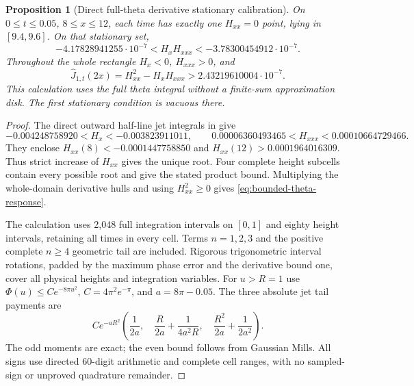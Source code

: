 \documentclass[11pt]{article}
\newtheorem{proposition}[theorem]{Proposition}
\theoremstyle{definition}
\theoremstyle{remark}
\begin{document}
\begin{proposition}[Direct full-theta derivative stationary calibration]
\label{prop:low-theta-sign}
On $0\le t\le0.05$, $8\le x\le12$, each time has exactly one
$H_{xx}=0$ point, lying in $[9.4,9.6]$. On that stationary set,
\[
 -4.17828941255\cdot10^{-7}<H_xH_{xxx}
 <-3.78300454912\cdot10^{-7}.
\]
Throughout the whole rectangle $H_x<0$, $H_{xxx}>0$, and
\begin{equation}
 \widehat J_{1,t}(2x)=H_{xx}^2-H_xH_{xxx}
 >2.43219610004\cdot10^{-7}.
 \label{eq:bounded-theta-response}
\end{equation}
This calculation uses the full theta integral without a finite-sum
approximation disk. The first stationary condition is vacuous there.
\end{proposition}
\begin{proof}
The direct outward half-line jet integrals in \cite{thetacontinuation}
give
\[
 -0.004248758920<H_x<-0.003823911011,\qquad
 0.00006360493465<H_{xxx}<0.00010664729466.
\]
They enclose $H_{xx}(8)<-0.0001447758850$ and
$H_{xx}(12)>0.0001964016309$. Thus strict increase of $H_{xx}$ gives
the unique root. Four complete height subcells contain every possible
root and give the stated product bound. Multiplying the whole-domain
derivative hulls and using $H_{xx}^2\ge0$ gives
\eqref{eq:bounded-theta-response}.

The calculation uses 2,048 full integration intervals on $[0,1]$ and
eighty height intervals, retaining all times in every cell. Terms
$n=1,2,3$ and the positive complete $n\ge4$ geometric tail are included.
Rigorous trigonometric interval rotations, padded by the maximum phase
error and the derivative bound one, cover all physical heights and
integration variables. For $u>R=1$ use
$\Phi(u)\le C e^{-8\pi u^2}$, $C=4\pi^2e^{-\pi}$, and
$a=8\pi-0.05$. The three absolute jet tail payments are
\[
 Ce^{-aR^2}\left(\frac1{2a},\quad
 \frac R{2a}+\frac1{4a^2R},\quad
 \frac{R^2}{2a}+\frac1{2a^2}\right).
\]
The odd moments are exact; the even bound follows from Gaussian Mills.
All signs use directed 60-digit arithmetic and complete cell ranges,
with no sampled-sign or unproved quadrature remainder.
\end{proof}
\end{document}
